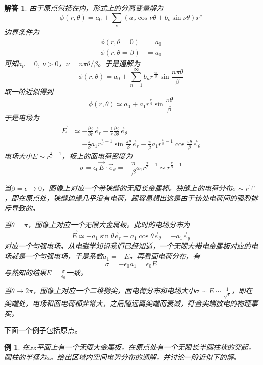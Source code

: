 \documentclass[a4paper,11pt]{ctexart}
\newtheorem{eg}{例}[section]
\newtheorem{ans}{解答}[section]
\newcommand{\beq}{\begin{equation}}
\newcommand{\eeq}{\end{equation}}
\newcommand{\bea}{\begin{equation}\begin{aligned}}
\newcommand{\eea}{\end{aligned}\end{equation}}
\newcommand{\epv}{\epsilon_0}
\newcommand{\pfrac}[2]{\frac{\partial #1}{\partial #2}}
\begin{document}
\begin{ans}
由于原点包括在内，形式上的分离变量解为
\beq
\phi(r,\theta) = a_0 + \sum_\nu (a_\nu \cos \nu \theta + b_\nu \sin \nu \theta) r^\nu
\eeq
边界条件为
\bea
\phi(r,\theta=0) &= a_0 \\
\phi(r,\theta=\beta) &= a_0
\eea
可知$a_\nu = 0,\ \nu>0$，$\nu = n\pi \theta /\beta$。于是通解为
\beq
\phi(r,\theta) = a_0 + \sum_{n=1}^\infty b_n r^{\frac{n\pi }{\beta}} \sin \frac{n\pi \theta}{\beta}
\eeq
取一阶近似得到
\beq
\phi(r,\theta) \simeq a_0 + a_1 r^\frac{\pi }{\beta} \sin \frac{\pi \theta}{\beta}
\eeq
于是电场为
\bea
\vec{E} &\simeq -\pfrac{\phi}{r} \vec{e}_r - \frac{1}{r} \pfrac{\phi}{\theta} \vec{e}_\theta \\
&=-\frac{\pi }{\beta}a_1 r^{\frac{\pi }{\beta}-1} \sin \frac{\pi  \theta}{\beta} \vec{e}_r-\frac{\pi }{\beta} a_1 r^{\frac{\pi }{\beta}-1} \cos \frac{\pi \theta }{\beta} \vec{e}_\theta
\eea
电场大小$E \sim r^{\frac{\pi }{\beta}-1}$，板上的面电荷密度为
\beq
\sigma = \epv \vec{E} \cdot \vec{e}_\theta  = -\frac{\pi }{\beta} a_1 r^{\frac{\pi }{\beta}-1}\sim r^{\frac{\pi}{\beta} - 1}
\eeq
\par
当$\beta = \epsilon \to 0$，图像上对应一个带狭缝的无限长金属棒。狭缝上的电荷分布$\sigma \sim r^{1/\epsilon}$，即在原点处，狭缝边缘几乎没有电荷，跟容易想出这是由于该处电荷间的强烈排斥导致的。
\par
当$\theta = \pi$，图像上对应一个无限大金属板。此时的电场分布为
\beq
\vec{E} \simeq - a_1 \sin \theta \vec{e}_r - a_1 \cos \theta \vec{e}_\theta = -a_1 \vec{e}_y
\eeq
对应一个匀强电场。从电磁学知识我们已经知道，一个无限大带电金属板对应的电场就是一个匀强电场，于是系数$a_1=-E$。再看面电荷分布，有
\beq
\sigma = - \epv a_1 =\epv E
\eeq
与熟知的结果$E = \frac{\sigma}{\epv}$一致。
\par
当$\theta \to 2\pi$，图像上对应一个二维劈尖，面电荷分布和电场大小$\sigma \sim E\sim \frac{1}{\sqrt{r}}$，即在尖端处，电场和面电荷都非常大，之后随远离尖端而衰减，符合尖端放电的物理事实。
\end{ans}
下面一个例子包括原点。
\begin{eg}
在$xz$平面上有一个无限大金属板，在原点处有一个无限长半圆柱状的突起，圆柱的半径为$a$。给出区域内空间电势分布的通解，并讨论一阶近似下的解。
\end{eg}
\end{document}

